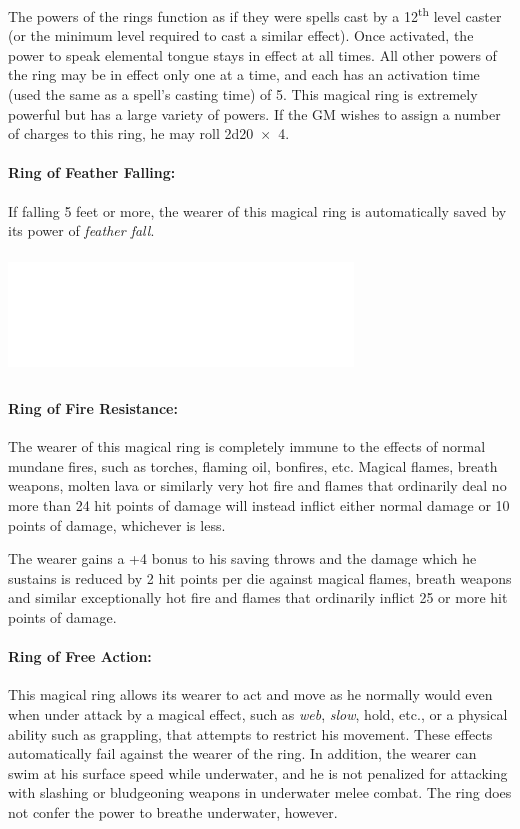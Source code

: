 \begin{multicols}{2}

The powers of the rings function as if they were spells cast by a 12\textsuperscript{th} level caster (or the minimum level required to cast a similar effect).  Once activated, the power to speak elemental tongue stays in effect at all times.  All other powers of the ring may be in effect only one at a time, and each has an activation time (used the same as a spell's casting time) of 5.  This magical ring is extremely powerful but has a large variety of powers.  If the GM wishes to assign a number of charges to this ring, he may roll 2d20~$\times$~4.

\paragraph{Ring of Feather Falling:} If falling 5 feet or more, the wearer of this magical ring is automatically saved by its power of \textit{feather fall}.

\noindent\includegraphics[width=3.6in, height=1.25in]{testblock.pdf}

\paragraph{Ring of Fire Resistance:} The wearer of this magical ring is completely immune to the effects of normal mundane fires, such as torches, flaming oil, bonfires, etc.  Magical flames, breath weapons, molten lava or similarly very hot fire and flames that ordinarily deal no more than 24 hit points of damage will instead inflict either normal damage or 10 points of damage, whichever is less.  

The wearer gains a +4 bonus to his saving throws and the damage which he sustains is reduced by 2 hit points per die against magical flames, breath weapons and similar exceptionally hot fire and flames that ordinarily inflict 25 or more hit points of damage.

\paragraph{Ring of Free Action:} This magical ring allows its wearer to act and move as he normally would even when under attack by a magical effect, such as \textit{web}, \textit{slow}, hold, etc., or a physical ability such as grappling, that attempts to restrict his movement.  These effects automatically fail against the wearer of the ring.  In addition, the wearer can swim at his surface speed while underwater, and he is not penalized for attacking with slashing or bludgeoning weapons in underwater melee combat.  The ring does not confer the power to breathe underwater, however.


\end{multicols}

